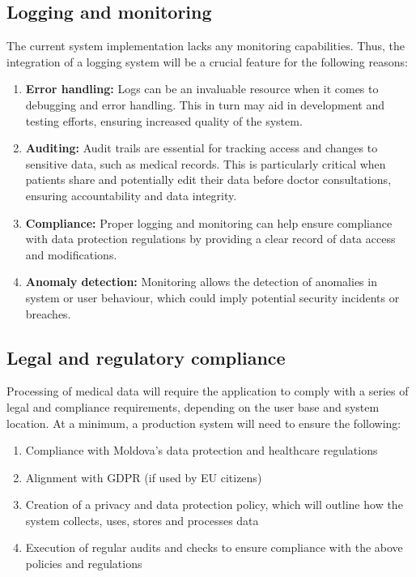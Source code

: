 \subsection{Logging and monitoring}

The current system implementation lacks any monitoring capabilities. Thus, the integration of a logging system will be a crucial feature for the following reasons:

\begin{enumerate}
    \item \textbf{Error handling:} Logs can be an invaluable resource when it comes to debugging and error handling. This in turn may aid in development and testing efforts, ensuring increased quality of the system.
    \item \textbf{Auditing:} Audit trails are essential for tracking access and changes to sensitive data, such as medical records. This is particularly critical when patients share and potentially edit their data before doctor consultations, ensuring accountability and data integrity.
    \item \textbf{Compliance:} Proper logging and monitoring can help ensure compliance with data protection regulations by providing a clear record of data access and modifications. 
    \item \textbf{Anomaly detection:} Monitoring allows the detection of anomalies in system or user behaviour, which could imply potential security incidents or breaches.
\end{enumerate}

\subsection{Legal and regulatory compliance}

Processing of medical data will require the application to comply with a series of legal and compliance requirements, depending on the user base and system location. At a minimum, a production system will need to ensure the following:

\begin{enumerate}
    \item Compliance with Moldova's data protection and healthcare regulations
    \item Alignment with GDPR (if used by EU citizens)
    \item Creation of a privacy and data protection policy, which will outline how the system collects, uses, stores and processes data
    \item Execution of regular audits and checks to ensure compliance with the above policies and regulations
\end{enumerate}

